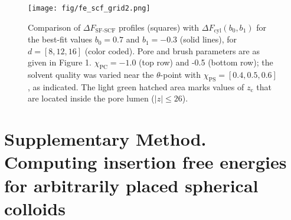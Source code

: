 \documentclass[10pt, a4paper]{article}
\begin{document}
\begin{multicols}{2}
\begin{figure}[H]
    \centering
    \texttt{[image: fig/fe\_scf\_grid2.png]}
    \caption{ 
    Comparison of $\Delta F_{\text{SF-SCF}}$ profiles (squares) with $\Delta F_{\text{cyl}}(b_0,b_1)$ for the best-fit values $b_0 = 0.7$ and $b_1 = -0.3$ (solid lines), for $d = [8, 12, 16]$ (color coded).
    Pore and brush parameters are as given in Figure 1. $\chi_{\text{PC}} = -1.0$ (top row) and -0.5 (bottom row); the solvent quality was varied near the $\theta$-point with $\chi_{\text{PS}} = [0.4, 0.5, 0.6]$, as indicated.
    The light green hatched area marks values of $z_{\text{c}}$ that are located inside the pore lumen ($|z| \leq 26$).
    \label{fig:fe_scf_grid}
    }
\end{figure}

\end{multicols}

\section{Supplementary Method. Computing insertion free energies for arbitrarily placed spherical colloids}
\end{document}

